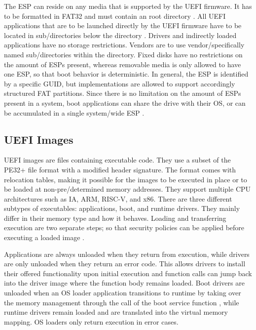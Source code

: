 The \ac{ESP} can reside on any media that is supported by the \ac{UEFI} firmware.
It has to be formatted in \ac{FAT}32 \cite[Section 13.3]{uefi-spec} and must contain an  root directory \cite[Section 13.3.1.3]{uefi-spec}.
All \ac{UEFI} applications that are to be launched directly by the \ac{UEFI} firmware have to be located in sub\-/directories below the  directory \cite[Section 13.3.1.3]{uefi-spec}.
Drivers and indirectly loaded applications have no storage restrictions.
Vendors are to use vendor\-/specifically named sub\-/directories within the  directory.
Fixed disks have no restrictions on the amount of \acp{ESP} present, whereas removable media is only allowed to have one \ac{ESP}, so that boot behavior is deterministic.
In general, the \ac{ESP} is identified by a specific \ac{GUID}, but implementations are allowed to support accordingly structured \ac{FAT} partitions.
Since there is no limitation on the amount of \acp{ESP} present in a system, boot applications can share the drive with their \ac{OS}, or can be accumulated in a single system\-/wide \ac{ESP} \cite[Section 13.3.3]{uefi-spec}.

\subsection{\acs{UEFI} Images}

\ac{UEFI} images are files containing executable code. They use a subset of the \ac{PE32}+ file format with a modified header signature.
The format comes with relocation tables, making it possible for the images to be executed in place or to be loaded at non-pre\-/determined memory addresses.
They support multiple CPU architectures such as IA, ARM, RISC-V, and x86.
There are three different subtypes of executables: applications, boot, and runtime drivers. They mainly differ in their memory type and how it behaves.
Loading and transferring execution are two separate steps; so that security policies can be applied before executing a loaded image \cite[Section 2.1.1]{uefi-spec}.

Applications are always unloaded when they return from execution, while drivers are only unloaded when they return an error code. This allows drivers to install their offered functionality upon initial execution and function calls can jump back into the driver image where the function body remains loaded.
Boot drivers are unloaded when an \ac{OS} loader application transitions to runtime by taking over the memory management through the call of the boot service function , while runtime drivers remain loaded and are translated into the virtual memory mapping. \ac{OS} loaders only return execution in error cases.


